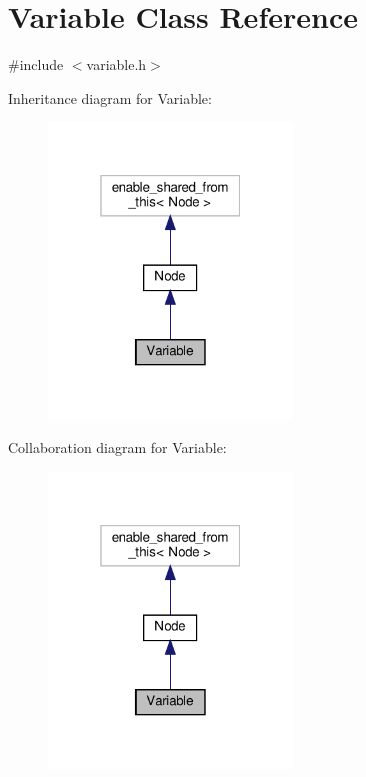 \hypertarget{class_variable}{}\section{Variable Class Reference}
\label{class_variable}


{\ttfamily \#include $<$variable.\+h$>$}



Inheritance diagram for Variable\+:\nopagebreak
\begin{figure}[H]
\begin{center}
\leavevmode
\includegraphics[width=184pt]{d5/d6a/class_variable__inherit__graph}
\end{center}
\end{figure}


Collaboration diagram for Variable\+:\nopagebreak
\begin{figure}[H]
\begin{center}
\leavevmode
\includegraphics[width=184pt]{d3/d52/class_variable__coll__graph}
\end{center}
\end{figure}
